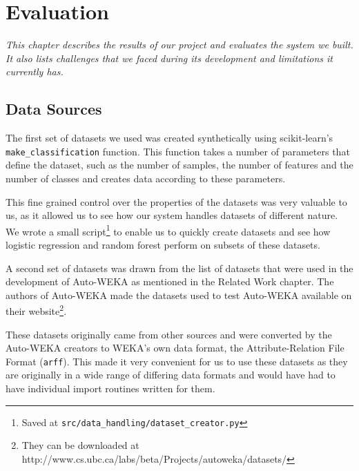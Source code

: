 \documentclass[a4paper,12pt,twoside,openright]{report}
\begin{document}
\chapter{Evaluation}
\label{ch:evaluation}
\textit{This chapter describes the results of our project and evaluates the system we built. It also lists challenges that we faced during its development and limitations it currently has.}




 




\section{Data Sources}
The first set of datasets we used was created synthetically using scikit-learn's \texttt{make\_classification} function. This function takes a number of parameters that define the dataset, such as the number of samples, the number of features and the number of classes and creates data according to these parameters. 

This fine grained control over the properties of the datasets was very valuable to us, as it allowed us to see how our system handles datasets of different nature. We wrote a small script\footnote{Saved at \texttt{src/data\_handling/dataset\_creator.py}} to enable us to quickly create datasets and see how logistic regression and random forest perform on subsets of these datasets.


A second set of datasets was drawn from the list of datasets that were used in the development of Auto-WEKA as mentioned in the Related Work chapter. The authors of Auto-WEKA made the datasets used to test Auto-WEKA available on their website\footnote{They can be downloaded at http://www.cs.ubc.ca/labs/beta/Projects/autoweka/datasets/}.


These datasets originally came from other sources \cite{Lichman:2013, Larochelle:2007:EED:1273496.1273556, Krizhevsky09learningmultiple} and were converted by the Auto-WEKA creators to WEKA's own data format, the Attribute-Relation File Format (\texttt{arff}). This made it very convenient for us to use these datasets as they are originally in a wide range of differing data formats and would have had to have individual import routines written for them. 
\end{document}
